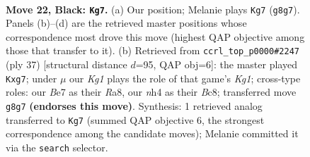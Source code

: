 \documentclass[11pt]{article}
\begin{document}
\clearpage

\begin{figure}[p]\centering
\begin{subfigure}{0.46\textwidth}\centering
\resizebox{\linewidth}{!}{%
\newchessgame
\chessboard[
  setfen={1nr3k1/rp1bbp2/p1q1pN2/B5p1/7N/3BP3/PP3PPP/R2QR1K1 b - - 0 22},
  showmover=false,
  pgfstyle=straightmove, color=movearrow, markmove={g8-g7}
]}
\caption{}
\end{subfigure}\hfill
\begin{subfigure}{0.46\textwidth}\centering
\resizebox{\linewidth}{!}{%
\newchessgame
\chessboard[
  setfen={rqb2rk1/pp1nppBp/6p1/1N1n4/8/8/PPP1BPPP/R2QR1K1 b - - 0 19},
  showmover=false,
  pgfstyle=straightmove, color=movearrow, markmove={g8-g7}
]}
\caption{}
\end{subfigure}
\\[4pt]

\caption{\textbf{Move 22, Black: \texttt{Kg7}.} (a) Our position; Melanie plays \texttt{Kg7} (\texttt{g8g7}). Panels (b)--(d) are the retrieved master positions whose correspondence most drove this move (highest QAP objective among those that transfer to it). (b) Retrieved from \texttt{ccrl\_top\_p0000\#2247} (ply 37) [structural distance $d$=95, QAP obj=6]: the master played \texttt{Kxg7}; under $\mu$ our \emph{Kg1} plays the role of that game's \emph{Kg1}; cross-type roles: our \emph{B}e7 as their \emph{R}a8, our \emph{n}h4 as their \emph{B}c8; transferred move \texttt{g8g7} \textbf{(endorses this move)}. Synthesis: 1 retrieved analog transferred to \texttt{Kg7} (summed QAP objective 6, the strongest correspondence among the candidate moves); Melanie committed it via the \texttt{search} selector.}
\label{fig:thought-m43}
\end{figure}

\clearpage
\end{document}
